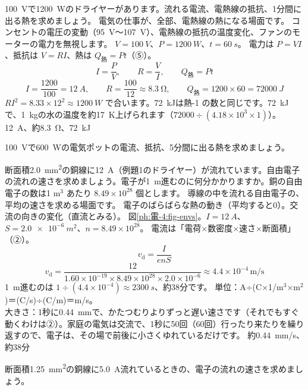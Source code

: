\label{ph:電-4:ex1}
\begin{phreidai}
\qty{100}{V}で\qty{1200}{W}のドライヤーがあります。流れる電流、電熱線の抵抗、1分間に出る熱を求めましょう。
\phbamen
電気の仕事が、全部、電熱線の熱になる場面です。
\phmushi
コンセントの電圧の変動（\qty{95}{V}〜\qty{107}{V}）、電熱線の抵抗の温度変化、ファンのモーターの電力を無視します。
\phzu
$V=\qty{100}{V}$、$P=\qty{1200}{W}$、$t=\qty{60}{s}$。
\phriyu
電力は $P=VI$、抵抗は $V=RI$、熱は $Q_{\text{熱}}=Pt$（⑤）。
\phtateru
\[I=\frac{P}{V},\qquad R=\frac{V}{I},\qquad Q_{\text{熱}}=Pt\]
\phtoku
\[I=\frac{1200}{100}=\qty{12}{A},\qquad R=\frac{100}{12}\approx\qty{8.3}{\ohm},\qquad Q_{\text{熱}}=1200\times60=\qty{72000}{J}\]
\phtashikame
$RI^2=8.33\times12^2\approx\qty{1200}{W}$ で合います。\qty{72}{kJ}は熱-1 の数と同じです。\qty{72}{kJ}で、\qty{1}{kg}の水の温度を約\qty{17}{K}上げられます（$72000\div(4.18\times10^3\times1)$）。
\kotae \qty{12}{A}、約\qty{8.3}{\ohm}、\qty{72}{kJ}
\end{phreidai}
\begin{jibun}
\qty{100}{V}で\qty{600}{W}の電気ポットの電流、抵抗、5分間に出る熱を求めましょう。
\end{jibun}

\label{ph:電-4:ex2}
\begin{phreidai}[銅線の中の電子の速さ]
断面積\qty{2.0}{mm^2}の銅線に\qty{12}{A}（例題1のドライヤー）が流れています。自由電子の流れの速さを求めましょう。電子が\qty{1}{m}進むのに何分かかりますか。銅の自由電子の数は1 m$^3$ あたり $8.49\times10^{28}$ 個とします。
\phbamen
導線の中を流れる自由電子の、平均の速さを求める場面です。
\phmushi
電子のばらばらな熱の動き（平均すると0）。交流の向きの変化（直流とみる）。
\phzu
図\ref{ph:電-4:fig-envs}。$I=\qty{12}{A}$、$S=\qty{2.0e-6}{m^2}$、$n=8.49\times10^{28}$。
\phriyu
電流は「電荷×数密度×速さ×断面積」（②）。
\phtateru
\[v_{\mathrm d}=\frac{I}{enS}\]
\phtoku
\[v_{\mathrm d}=\frac{12}{1.60\times10^{-19}\times8.49\times10^{28}\times2.0\times10^{-6}}\approx4.4\times10^{-4}\,\text{m/s}\]
\qty{1}{m}進むのは $1\div(4.4\times10^{-4})\approx\qty{2300}{s}$、約38分です。
\phtashikame
単位：A÷(C×1/m$^3$×m$^2$)＝(C/s)÷(C/m)＝m/s。\\
大きさ：1秒に\qty{0.44}{mm}で、かたつむりよりずっと遅い速さです（それでもすぐ動くわけは②）。家庭の電気は交流で、1秒に50回（60回）行ったり来たりを繰り返すので、電子は、その場で前後に小さくゆれているだけです。
\kotae 約\qty{0.44}{mm/s}、約38分
\end{phreidai}
\begin{jibun}
断面積\qty{1.25}{mm^2}の銅線に\qty{5.0}{A}流れているときの、電子の流れの速さを求めましょう。
\end{jibun}

